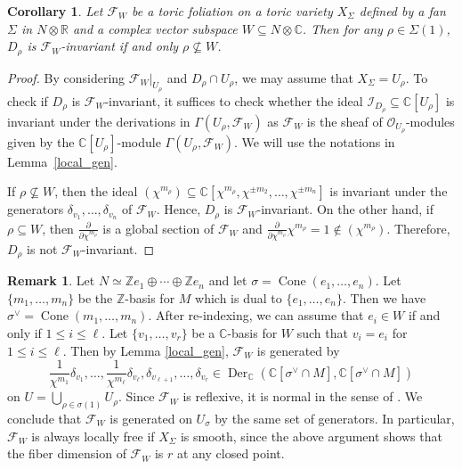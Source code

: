 \documentclass[12pt,reqno]{amsart}
\newtheorem{corollary}[theorem]{Corollary}
\theoremstyle{definition}
\newtheorem{remark}[theorem]{Remark}
\newcommand{\mc}{\mathcal}
\newcommand{\mb}{\mathbb}
\newcommand{\on}{\operatorname}
\newcommand\cF{{\mathcal{F}}}
\newcommand\cI{{\mathcal{I}}}
\newcommand\cO{{\mathcal{O}}}
\newcommand\bC{{\mathbb C}}
\newcommand\bR{{\mathbb R}}
\begin{document}
\begin{corollary}\label{basics}
    Let $\cF_W$ be a toric foliation on a toric variety $X_\Sigma$ defined by a fan $\Sigma$ in $N\otimes\bR$ and a complex vector subspace $W\subseteq N\otimes\bC$. Then for any $\rho\in\Sigma(1)$, $D_\rho$ is $\mc F_W$-invariant if and only $\rho\nsubseteq W$.
\end{corollary}
\begin{proof}
    By considering $\mc F_W\vert_{U_\rho}$ and $D_\rho\cap U_\rho$, we may assume that $X_\Sigma=U_\rho$. 
    To check if $D_\rho$ is $\cF_W$-invariant, it suffices to check whether the ideal $\cI_{D_\rho}\subseteq\mb C[U_\rho]$ is invariant under the derivations in $\Gamma(U_\rho,\mc F_W)$ as $\cF_W$ is the sheaf of $\cO_{U_\rho}$-modules given by the $\bC[U_\rho]$-module $\Gamma(U_\rho,\cF_W)$. 
    We will use the notations in Lemma~\ref{local_gen}. 
    
    If $\rho\nsubseteq W$, then the ideal $(\chi^{m_\rho})\subseteq \mb C[\chi^{m_\rho},\chi^{\pm m_2},\ldots,\chi^{\pm m_n}]$ is invariant under the generators $\delta_{v_1},\ldots,\delta_{v_n}$ of $\mc F_W$. 
    Hence, $D_\rho$ is $\mc F_W$-invariant. 
    On the other hand, if $\rho\subseteq W$, then $\frac{\partial}{\partial\chi^{m_\rho}}$ is a global section of $\mc F_W$ and $\frac{\partial}{\partial\chi^{m_\rho}}\chi^{m_\rho}=1\notin(\chi^{m_\rho})$. 
    Therefore, $D_\rho$ is not $\cF_W$-invariant.
\end{proof}


\begin{remark}\label{local_gen_extend} 
    Let $N\simeq\mb Ze_1\oplus\cdots\oplus\mb Z e_n$ and let $\sigma=\on{Cone}(e_1,\ldots,e_n)$.
    Let $\{m_1,\ldots,m_n\}$ be the $\mb Z$-basis for $M$ which is dual to $\{e_1,\ldots,e_n\}$. 
    Then we have $\sigma^{\vee}=\on{Cone}( m_1,\ldots,m_n)$. 
    After re-indexing, we can assume that 
    $e_i\in W$ if and only if $1\leq i\leq \ell$. 
    Let $\{v_1,\ldots,v_r\}$ be a $\mb C$-basis for $W$ such that $v_i=e_i$ for $1\leq i\leq \ell$. 
    Then by Lemma \ref{local_gen}, $\mc F_W$ is generated by
    \[\frac{1}{\chi^{m_1}}\delta_{v_1},\ldots,\frac{1}{\chi^{m_\ell}}\delta_{v_\ell},\delta_{v_{\ell+1}},\ldots,\delta_{v_{r}}\in\on{Der}_{\mb C}(\mb C[\sigma^\vee\cap M],\mb C[\sigma^\vee\cap M])\] on $U=\bigcup_{\rho\in\sigma(1)}{U_\rho}$.
    Since $\mc F_W$ is reflexive, it is normal in the sense of \cite[Definition 1.1.11]{MR2815674}.
    We conclude that $\mc F_W$ is generated on $U_\sigma$ by the same set of generators. In particular, $\mc F_W$ is always locally free if $X_\Sigma$ is smooth, since the above argument shows that the fiber dimension of $\mc F_W$ is $r$ at any closed point.
\end{remark}
\end{document}
